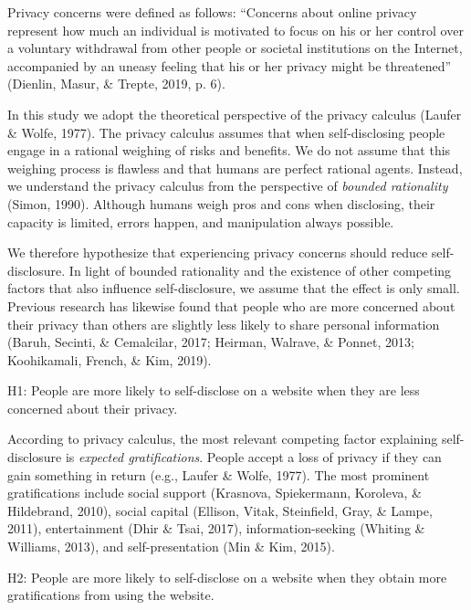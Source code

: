 \documentclass[
  english,
  man,floatsintext]{apa6}
\begin{document}
Privacy concerns were defined as follows:
``Concerns about online privacy represent how much an individual is motivated to focus on his or her control over a voluntary withdrawal from other people or societal institutions on the Internet, accompanied by an uneasy feeling that his or her privacy might be threatened'' (Dienlin, Masur, \& Trepte, 2019, p. 6).

In this study we adopt the theoretical perspective of the privacy calculus (Laufer \& Wolfe, 1977).
The privacy calculus assumes that when self-disclosing people engage in a rational weighing of risks and benefits.
We do not assume that this weighing process is flawless and that humans are perfect rational agents.
Instead, we understand the privacy calculus from the perspective of \emph{bounded rationality} (Simon, 1990).
Although humans weigh pros and cons when disclosing, their capacity is limited, errors happen, and manipulation always possible.

We therefore hypothesize that experiencing privacy concerns should reduce self-disclosure.
In light of bounded rationality and the existence of other competing factors that also influence self-disclosure, we assume that the effect is only small.
Previous research has likewise found that people who are more concerned about their privacy than others are slightly less likely to share personal information (Baruh, Secinti, \& Cemalcilar, 2017; Heirman, Walrave, \& Ponnet, 2013; Koohikamali, French, \& Kim, 2019).

H1: People are more likely to self-disclose on a website when they are less concerned about their privacy.

According to privacy calculus, the most relevant competing factor explaining self-disclosure is \emph{expected gratifications}.
People accept a loss of privacy if they can gain something in return (e.g., Laufer \& Wolfe, 1977).
The most prominent gratifications include social support (Krasnova, Spiekermann, Koroleva, \& Hildebrand, 2010), social capital (Ellison, Vitak, Steinfield, Gray, \& Lampe, 2011), entertainment (Dhir \& Tsai, 2017), information-seeking (Whiting \& Williams, 2013), and self-presentation (Min \& Kim, 2015).

H2: People are more likely to self-disclose on a website when they obtain more gratifications from using the website.
\end{document}
